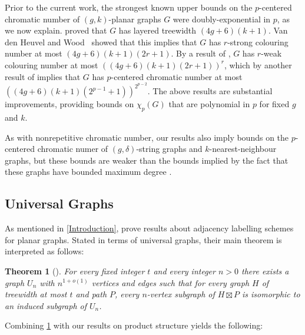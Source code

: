 \documentclass{patmorin}
\theoremstyle{plain}
\newtheorem{thm}{Theorem}
\theoremstyle{definition}
\begin{document}
Prior to the current work, the strongest known upper bounds on the $p$-centered chromatic number of $(g,k)$-planar graphs $G$ were doubly-exponential in $p$, as we now explain. \citet{dujmovic.eppstein.ea:structure} proved that $G$ has layered treewidth $(4g+6)(k+1)$.
Van den Heuvel and Wood~\citep{vdHW18} showed that this implies that $G$  has $r$-strong colouring number at most $(4g + 6)(k + 1)(2r + 1)$. By a result of \citet{zhu:colouring}, $G$ has $r$-weak colouring number at most $( (4g + 6)(k + 1)(2r + 1) )^r$, which by another result of  \citet{zhu:colouring} implies that $G$ has  $p$-centered chromatic number at most $( (4g+6)(k+1)(2^{p-1} + 1) )^{2^{p-2}}$. The above results are substantial improvements, providing bounds on $\chi_p(G)$ that are polynomial in $p$ for fixed $g$ and $k$.

As with nonrepetitive chromatic number, our results also imply bounds on the $p$-centered chromatic numer of $(g,\delta)$-string graphs and $k$-nearest-neighbour graphs, but these bounds are weaker than the bounds implied by the fact that these graphs have bounded maximum degree \cite{DFMS21}.

\subsection{Universal Graphs}

As mentioned in \cref{Introduction}, \citet{DEJGMM21} prove results about adjacency labelling schemes for planar graphs. Stated in terms of universal graphs, their main theorem is interpreted as follows:

\begin{thm}[\citep{DEJGMM21,EJM}]
	\label{Universal}
	For every fixed integer $t$ and every integer $n>0$ there exists a
	graph $U_n$ with $n^{1+o(1)}$ vertices and edges such that for every graph $H$ of treewidth at most $t$ and path $P$, every $n$-vertex subgraph of $H\boxtimes P$ is isomorphic to an induced subgraph of $U_n$.
\end{thm}

Combining \cref{Universal} with our results on product structure yields the following:
\end{document}
